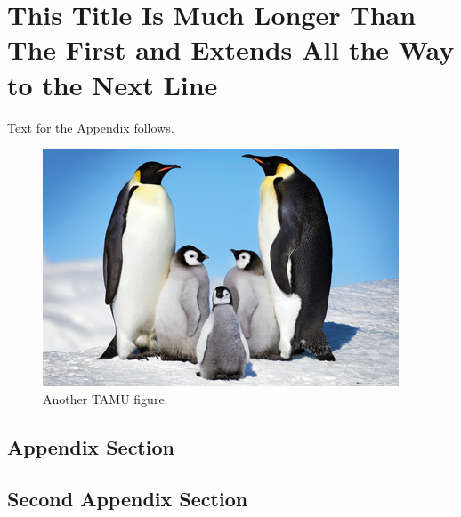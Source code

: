 %
%
%
%
%


\chapter{This Title Is Much Longer Than The First and Extends All the Way to the Next Line}

Text for the Appendix follows.

\begin{figure}[h]
    \centering
    \includegraphics[scale=.50]{images/Penguins.jpg}
    \caption{Another TAMU figure.}
    \label{fig:tamu-fig6}
\end{figure}

\section{Appendix Section}

\section{Second Appendix Section}


\pagebreak{}
